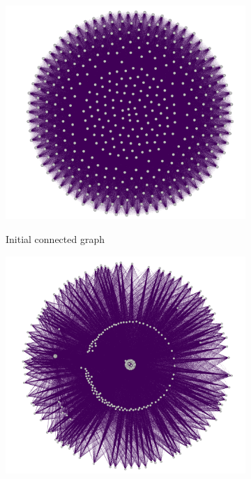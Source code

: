 \documentclass{pasa}%
\begin{document}
\begin{figure}[H]

\begin{subfigure}{.33\textwidth}
  \centering
  \includegraphics[width=\textwidth]{fig/step1.png}
  \label{fig:orig}
  \caption{Initial connected graph}
\end{subfigure}%
\begin{subfigure}{.33\textwidth}
  \centering
  \includegraphics[width=\textwidth]{fig/step2.png}

\end{subfigure}
\end{figure}
\end{document}
